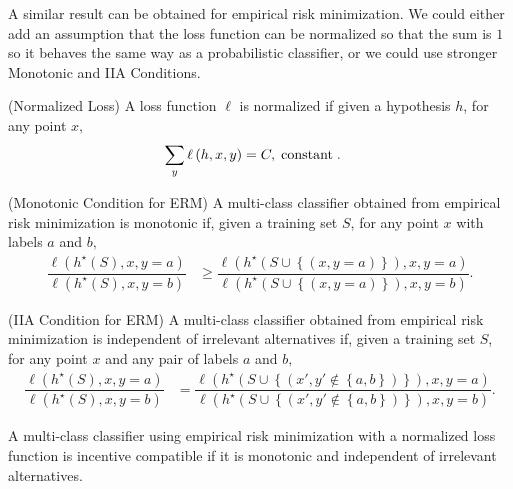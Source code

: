 \documentclass{article}
\begin{document}
\newline \newline
A similar result can be obtained for empirical risk minimization. We could either add an assumption that the loss function can be normalized so that the sum is $1$ so it behaves the same way as a probabilistic classifier, or we could use stronger Monotonic and IIA Conditions.
\newline \newline
\begin{df} \label{df:nrml} 
(Normalized Loss) A loss function $\ell$ is normalized if given a hypothesis $h $, for any point $x, $
\begin{align*}
\displaystyle\sum_{y} \ell\left(h, x, y\right) &= C , \text{\;constant\;} .
\end{align*}\end{df}
\begin{df} \label{df:monoerm} 
(Monotonic Condition for ERM) A multi-class classifier obtained from empirical risk minimization is monotonic if, given a training set $S $, for any point $x $ with labels $a $ and $b, $
\begin{align*}
\dfrac{\ell\left(h^\star \left(S\right), x, y = a\right)}{\ell\left(h^\star \left(S\right), x, y = b\right)} &\geq  \dfrac{\ell\left(h^\star \left(S \cup \left\{\left(x, y = a\right)\right\}\right), x, y = a\right)}{\ell\left(h^\star \left(S \cup \left\{\left(x, y = a\right)\right\}\right), x, y = b\right)}.
\end{align*}\end{df}
\begin{df} \label{df:iiaerm} 
(IIA Condition for ERM) A multi-class classifier obtained from empirical risk minimization is independent of irrelevant alternatives if, given a training set $S $, for any point $x $ and any pair of labels $a $ and $b, $
\begin{align*}
\dfrac{\ell\left(h^\star \left(S\right), x, y = a\right)}{\ell\left(h^\star \left(S\right), x, y = b\right)} &= \dfrac{\ell\left(h^\star \left(S \cup \left\{\left(x', y' \notin \left\{a, b\right\}\right)\right\}\right), x, y = a\right)}{\ell\left(h^\star \left(S \cup \left\{\left(x', y' \notin \left\{a, b\right\}\right)\right\}\right), x, y = b\right)}.
\end{align*}\end{df}
\begin{prop} \label{prop:marginerm} 
A multi-class classifier using empirical risk minimization with a normalized loss function is incentive compatible if it is monotonic and independent of irrelevant alternatives.
\end{prop}
\end{document}
